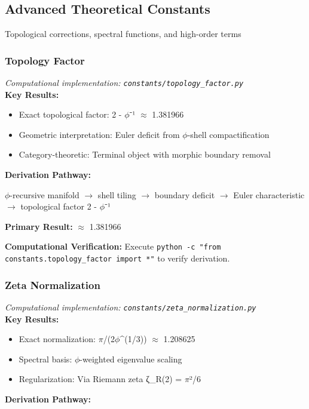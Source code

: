 \subsection{Advanced Theoretical Constants}

Topological corrections, spectral functions, and high-order terms

\subsubsection{Topology Factor}
\textit{Computational implementation: \texttt{constants/topology_factor.py}}\\

\textbf{Key Results:}
\begin{itemize}
    \item Exact topological factor: 2 - $\phi$⁻¹ $\approx$ 1.381966
    \item Geometric interpretation: Euler deficit from $\phi$-shell compactification
    \item Category-theoretic: Terminal object with morphic boundary removal
\end{itemize}

\textbf{Derivation Pathway:}

$\phi$-recursive manifold $\to$ shell tiling $\to$ boundary deficit $\to$ 
Euler characteristic $\to$ topological factor 2 - $\phi$⁻¹

\textbf{Primary Result:} $\approx$ 1.381966

\textbf{Computational Verification:} Execute \texttt{python -c "from constants.topology_factor import *"} to verify derivation.

\subsubsection{Zeta Normalization}
\textit{Computational implementation: \texttt{constants/zeta_normalization.py}}\\

\textbf{Key Results:}
\begin{itemize}
    \item Exact normalization: $\pi$/(2$\phi$^(1/3)) $\approx$ 1.208625
    \item Spectral basis: $\phi$-weighted eigenvalue scaling
    \item Regularization: Via Riemann zeta ζ_R(2) = $\pi$²/6
\end{itemize}

\textbf{Derivation Pathway:}

